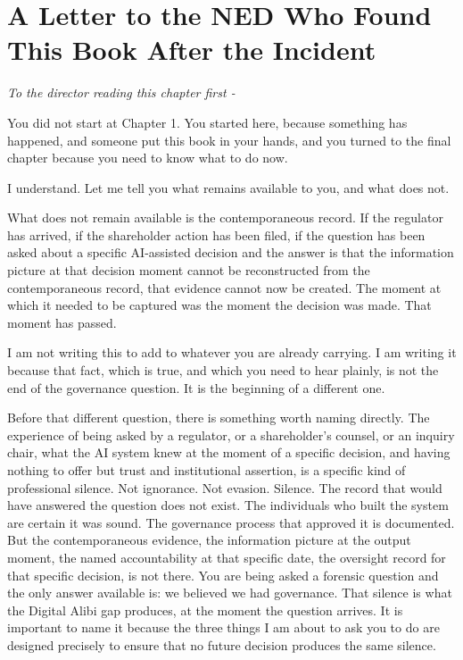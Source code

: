
\chapter{A Letter to the NED Who Found This Book After the Incident}

\emph{To the director reading this chapter first -}

You did not start at Chapter 1. You started here, because something has happened, and someone put this book in your hands, and you turned to the final chapter because you need to know what to do now.

I understand. Let me tell you what remains available to you, and what does not.

What does not remain available is the contemporaneous record. If the regulator has arrived, if the shareholder action has been filed, if the question has been asked about a specific AI-assisted decision and the answer is that the information picture at that decision moment cannot be reconstructed from the contemporaneous record, that evidence cannot now be created. The moment at which it needed to be captured was the moment the decision was made. That moment has passed.

I am not writing this to add to whatever you are already carrying. I am writing it because that fact, which is true, and which you need to hear plainly, is not the end of the governance question. It is the beginning of a different one.

Before that different question, there is something worth naming directly. The experience of being asked by a regulator, or a shareholder's counsel, or an inquiry chair, what the AI system knew at the moment of a specific decision, and having nothing to offer but trust and institutional assertion, is a specific kind of professional silence. Not ignorance. Not evasion. Silence. The record that would have answered the question does not exist. The individuals who built the system are certain it was sound. The governance process that approved it is documented. But the contemporaneous evidence, the information picture at the output moment, the named accountability at that specific date, the oversight record for that specific decision, is not there. You are being asked a forensic question and the only answer available is: we believed we had governance. That silence is what the Digital Alibi gap produces, at the moment the question arrives. It is important to name it because the three things I am about to ask you to do are designed precisely to ensure that no future decision produces the same silence.

